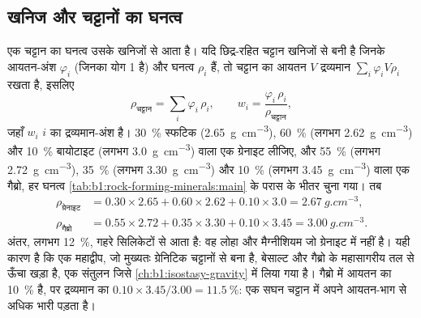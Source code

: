 \subsection{खनिज और चट्टानों का घनत्व}

एक चट्टान का घनत्व उसके खनिजों से आता है। यदि छिद्र-रहित चट्टान खनिजों से बनी है जिनके आयतन-अंश
$\varphi_i$ (जिनका योग 1 है) और घनत्व $\rho_i$ हैं, तो चट्टान का आयतन $V$ द्रव्यमान
$\sum_i \varphi_i V \rho_i$ रखता है, इसलिए
\[
  \rho_{\text{चट्टान}} = \sum_i \varphi_i\,\rho_i ,
  \qquad
  w_i = \frac{\varphi_i\,\rho_i}{\rho_{\text{चट्टान}}},
\]
जहाँ $w_i$  $i$ का द्रव्यमान-अंश है। \qty{30}{\percent} स्फटिक (\qty{2.65}{g.cm^{-3}}), \qty{60}{\percent} 
(लगभग \qty{2.62}{g.cm^{-3}}) और \qty{10}{\percent} बायोटाइट (लगभग \qty{3.0}{g.cm^{-3}}) वाला एक ग्रेनाइट लीजिए, और
\qty{55}{\percent}  (लगभग \qty{2.72}{g.cm^{-3}}), \qty{35}{\percent}  (लगभग
\qty{3.30}{g.cm^{-3}}) और \qty{10}{\percent}  (लगभग \qty{3.45}{g.cm^{-3}}) वाला एक गैब्रो, हर घनत्व
\cref{tab:b1:rock-forming-minerals:main} के परास के भीतर चुना गया। तब
\begin{align*}
  \rho_{\text{ग्रेनाइट}} &= 0.30\times2.65 + 0.60\times2.62 + 0.10\times3.0
  = \qty{2.67}{g.cm^{-3}},\\
  \rho_{\text{गैब्रो}} &= 0.55\times2.72 + 0.35\times3.30 + 0.10\times3.45
  = \qty{3.00}{g.cm^{-3}}.
\end{align*}
अंतर, लगभग \qty{12}{\percent}, गहरे सिलिकेटों से आता है: वह लोहा और मैग्नीशियम जो ग्रेनाइट में नहीं है। यही कारण है कि
एक महाद्वीप, जो मुख्यतः ग्रेनिटिक चट्टानों से बना है, बेसाल्ट और गैब्रो के महासागरीय तल से ऊँचा खड़ा है, एक संतुलन
जिसे \cref{ch:b1:isostasy-gravity} में लिया गया है। गैब्रो में  आयतन का \qty{10}{\percent} है, पर द्रव्यमान का
$0.10\times3.45/3.00 = \qty{11.5}{\percent}$: एक सघन  चट्टान में अपने आयतन-भाग से अधिक भारी पड़ता है।

